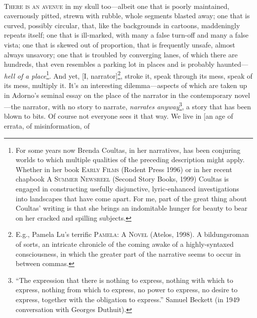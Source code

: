 \documentclass[
]{memoir}
\begin{document}
~

\lettrine[lines=3, findent=0em, nindent=0.1em, lhang=0]{T}{here is an avenue}
in my skull too---albeit one that is poorly maintained, cavernously
pitted, strewn with rubble, whole segments blasted away; one that is
curved, possibly circular, that, like the backgrounds in cartoons,
maddeningly repeats itself; one that is ill-marked, with many a false
turn-off and many a false vista; one that is skewed out of proportion,
that is frequently unsafe, almost always unsavory; one that is troubled
by converging lanes, of which there are hundreds, that even resembles a
parking lot in places and is probably haunted---\emph{hell of a
place}\footnote{For some years now Brenda Coultas, in her narratives,
  has been conjuring worlds to which multiple qualities of the preceding
  description might apply. Whether in her book \textsc{Early Films}
  (Rodent Press 1996) or in her recent chapbook \textsc{A Summer
  Newsreel} (Second Story Books, 1999) Coultas is engaged in
  constructing usefully disjunctive, lyric-enhanced investigations into
  landscapes that have come apart. For me, part of the great thing about
  Coultas' writing is that she brings an indomitable hunger for beauty
  to bear on her cracked and spilling subjects.}. And yet, {[}I,
narrator{]}\footnote{E.g., Pamela Lu's terrific \textsc{Pamela: A Novel}
  (Atelos, 1998). A bildungsroman of sorts, an intricate chronicle of
  the coming awake of a highly-syntaxed consciousness, in which the
  greater part of the narrative seems to occur in between commas.},
stroke it, speak through its mess, speak of its mess, multiply it. It's
an interesting dilemma---aspects of which are taken up in Adorno's
seminal essay on the place of the narrator in the contemporary
novel---the narrator, with no story to narrate, \emph{narrates
anyway}\footnote{``The expression that there is nothing to express,
  nothing with which to express, nothing from which to express, no power
  to express, no desire to express, together with the obligation to
  express.'' Samuel Beckett (in 1949 conversation with Georges Duthuit).},
a story that has been blown to bits. Of course not everyone sees it that
way. We live in {[}an age of errata, of misinformation, of
\end{document}

